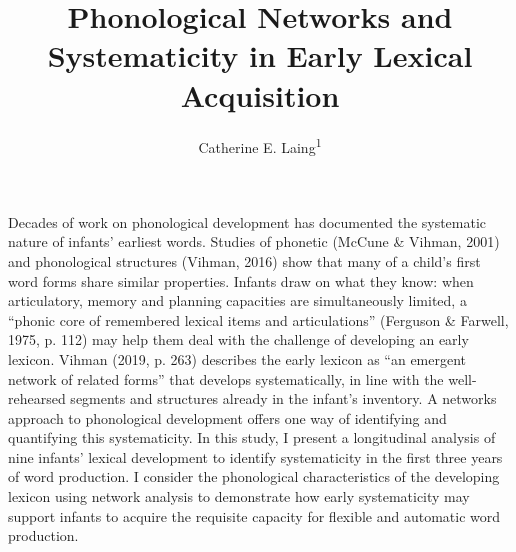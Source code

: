\documentclass[
  man]{apa6}
\title{Phonological Networks and Systematicity in Early Lexical Acquisition}
\author{Catherine E. Laing\textsuperscript{1}}
\date{}
\affiliation{\vspace{0.5cm}\textsuperscript{1} University of York, York, UK}
\begin{document}
\maketitle

Decades of work on phonological development has documented the systematic nature of infants' earliest words. Studies of phonetic (McCune \& Vihman, 2001) and phonological structures (Vihman, 2016) show that many of a child's first word forms share similar properties. Infants draw on what they know: when articulatory, memory and planning capacities are simultaneously limited, a ``phonic core of remembered lexical items and articulations'' (Ferguson \& Farwell, 1975, p. 112) may help them deal with the challenge of developing an early lexicon. Vihman (2019, p. 263) describes the early lexicon as ``an emergent network of related forms'' that develops systematically, in line with the well-rehearsed segments and structures already in the infant's inventory. A networks approach to phonological development offers one way of identifying and quantifying this systematicity. In this study, I present a longitudinal analysis of nine infants' lexical development to identify systematicity in the first three years of word production. I consider the phonological characteristics of the developing lexicon using network analysis to demonstrate how early systematicity may support infants to acquire the requisite capacity for flexible and automatic word production.
\end{document}
